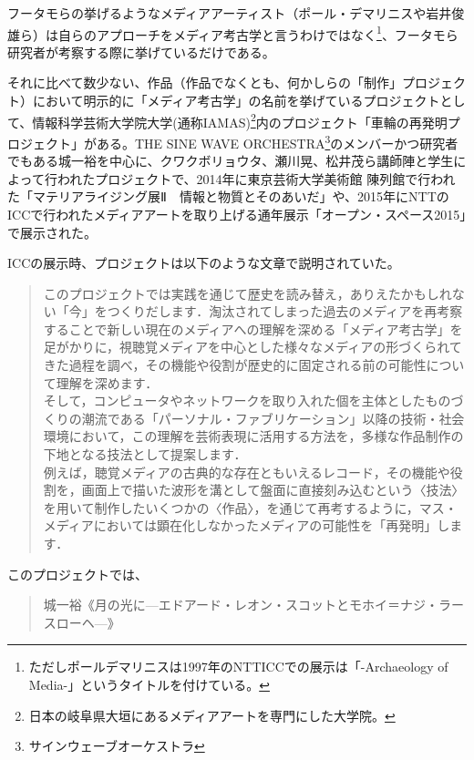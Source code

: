 \documentclass[a4paper,report]{jsbook}
\begin{document}
フータモらの挙げるようなメディアアーティスト（ポール・デマリニスや岩井俊雄ら）は自らのアプローチをメディア考古学と言うわけではなく\footnote{ただしポールデマリニスは1997年のNTTICCでの展示は「-Archaeology
  of Media-」というタイトルを付けている。}、フータモら研究者が考察する際に挙げているだけである。

それに比べて数少ない、作品（作品でなくとも、何かしらの「制作」プロジェクト）において明示的に「メディア考古学」の名前を挙げているプロジェクトとして、情報科学芸術大学院大学(通称IAMAS)\footnote{日本の岐阜県大垣にあるメディアアートを専門にした大学院。}内のプロジェクト「車輪の再発明プロジェクト」がある。THE
SINE WAVE ORCHESTRA\footnote{サインウェーブオーケストラ}のメンバーかつ研究者でもある城一裕を中心に、クワクボリョウタ、瀬川晃、松井茂ら講師陣と学生によって行われたプロジェクトで、2014年に東京芸術大学美術館
陳列館で行われた「マテリアライジング展Ⅱ　情報と物質とそのあいだ」や、2015年にNTTのICCで行われたメディアアートを取り上げる通年展示「オープン・スペース2015」で展示された。\autocites{iamas:RIWP}{mtrlzng:RIWP}

ICCの展示時、プロジェクトは以下のような文章で説明されていた。

\begin{quote}
このプロジェクトでは実践を通じて歴史を読み替え，ありえたかもしれない「今」をつくりだします．淘汰されてしまった過去のメディアを再考察することで新しい現在のメディアへの理解を深める「メディア考古学」を足がかりに，視聴覚メディアを中心とした様々なメディアの形づくられてきた過程を調べ，その機能や役割が歴史的に固定される前の可能性について理解を深めます．\\
そして，コンピュータやネットワークを取り入れた個を主体としたものづくりの潮流である「パーソナル・ファブリケーション」以降の技術・社会環境において，この理解を芸術表現に活用する方法を，多様な作品制作の下地となる技法として提案します．\\
例えば，聴覚メディアの古典的な存在ともいえるレコード，その機能や役割を，画面上で描いた波形を溝として盤面に直接刻み込むという〈技法〉を用いて制作したいくつかの〈作品〉，を通じて再考するように，マス・メディアにおいては顕在化しなかったメディアの可能性を「再発明」します．\\
\autocite{iamas:RIWP}
\end{quote}

このプロジェクトでは、

\begin{quote}
城一裕《月の光に---エドアード・レオン・スコットとモホイ＝ナジ・ラースローヘ---》
\end{quote}
\end{document}
